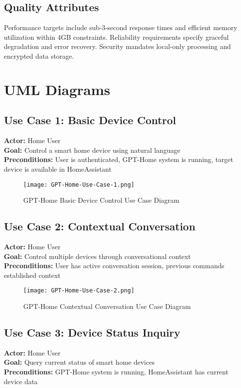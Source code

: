 \documentclass[12pt]{article}
\begin{document}
\subsection{Quality Attributes}
Performance targets include sub-3-second response times and efficient memory utilization within 4GB constraints. Reliability requirements specify graceful degradation and error recovery. Security mandates local-only processing and encrypted data storage.

\section{UML Diagrams}

\subsection{Use Case 1: Basic Device Control}
\noindent\textbf{Actor:} Home User \\
\textbf{Goal:} Control a smart home device using natural language \\
\textbf{Preconditions:} User is authenticated, GPT-Home system is running, target device is available in HomeAssistant

\begin{figure}[h]
\centering
\texttt{[image: GPT-Home-Use-Case-1.png]}
\caption{GPT-Home Basic Device Control Use Case Diagram}
\label{fig:usecase1}
\end{figure}

\subsection{Use Case 2: Contextual Conversation}
\noindent\textbf{Actor:} Home User \\
\textbf{Goal:} Control multiple devices through conversational context \\
\textbf{Preconditions:} User has active conversation session, previous commands established context

\begin{figure}[h]
\centering
\texttt{[image: GPT-Home-Use-Case-2.png]}
\caption{GPT-Home Contextual Conversation Use Case Diagram}
\label{fig:usecase2}
\end{figure}

\pagebreak

\subsection{Use Case 3: Device Status Inquiry}
\noindent\textbf{Actor:} Home User \\
\textbf{Goal:} Query current status of smart home devices \\
\textbf{Preconditions:} GPT-Home system is running, HomeAssistant has current device data
\end{document}
